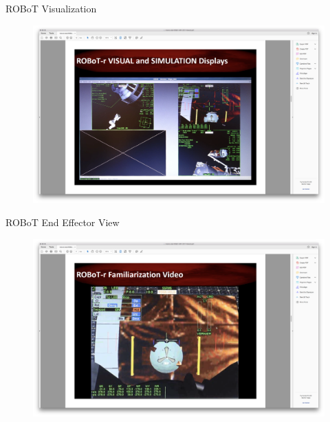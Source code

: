 \documentclass[10pt]{beamer}
\begin{document}
\begin{frame}[fragile]{ROBoT Visualization}
\begin{figure}
  \begin{center}
    \includegraphics[trim={13cm 5cm 22cm 15.5cm},clip,width=\linewidth]{../img/Screen_Shot_2018-07-26_at_1.43.02_PM.png}
  \end{center}
\end{figure}
\end{frame}

\begin{frame}[fragile]{ROBoT End Effector View}
\begin{figure}
  \begin{center}
    \includegraphics[trim={13cm 5cm 22cm 15.5cm},clip,width=\linewidth]{../img/Screen_Shot_2018-07-26_at_1.43.05_PM.png}
  \end{center}
\end{figure}
\end{frame}
\end{document}
